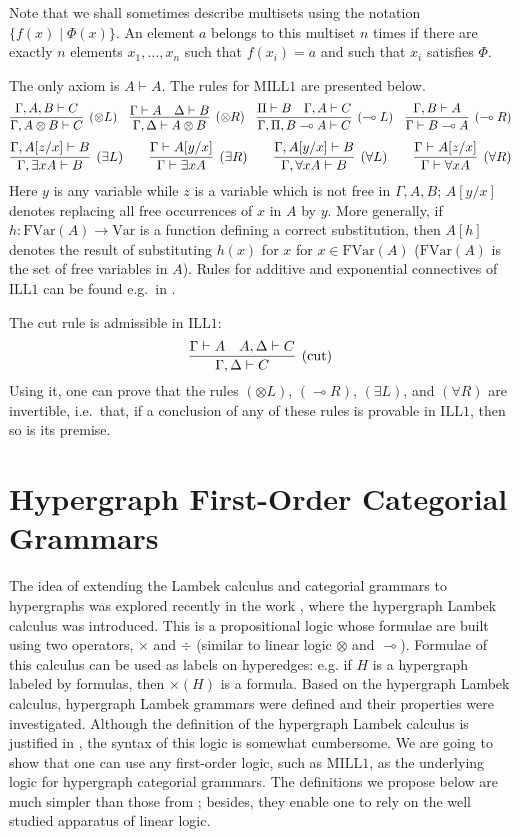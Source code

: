 \documentclass[a4paper,UKenglish,cleveref, autoref, thm-restate,pdfa]{lipics-v2021}
\newcommand{\Var}{\mathrm{Var}}
\newcommand{\FVar}{\mathrm{FVar}}
\newcommand{\mconj}{\otimes}
\newcommand{\limpl}{\multimap}
\newcommand{\yields}{\vdash}
\newcommand{\ILLFO}{\mathrm{ILL}1}
\newcommand{\MILLFO}{\mathrm{MILL}1}
\begin{document}
Note that we shall sometimes describe multisets using the notation $\{f(x) \mid \Phi(x) \}$. An element $a$ belongs to this multiset $n$ times if there are exactly $n$ elements $x_1,\ldots,x_n$ such that $f(x_i)=a$ and such that $x_i$ satisfies $\Phi$.

The only axiom is $A \vdash A$. The rules for $\MILLFO$ are presented below.
$$
\infer[(\mconj L)]{\Gamma,A \mconj B \yields C}{\Gamma,A, B \yields C}
\quad
\infer[(\mconj R)]{\Gamma,\Delta \yields A \mconj B}{\Gamma \yields A & \Delta \yields B}
\quad
\infer[(\multimap L)]{\Gamma, \Pi, B \multimap A \yields C}{\Pi \yields B & \Gamma, A \yields C}
\quad
\infer[(\multimap R)]{\Gamma \yields B \multimap A}{\Gamma, B \yields A}
$$
$$
\infer[(\exists L)]{\Gamma, \exists x A \yields B}{\Gamma, A[z/x] \yields B} 
\qquad
\infer[(\exists R)]{\Gamma \yields \exists x A}{\Gamma \yields A[y/x]}
\qquad
\infer[(\forall L)]{\Gamma, \forall x A \yields B}{\Gamma, A[y/x] \yields B} 
\qquad
\infer[(\forall R)]{\Gamma \yields \forall x A}{\Gamma \yields A[z/x]}
$$
Here $y$ is any variable while $z$ is a variable which is not free in $\Gamma,A,B$; $A[y/x]$ denotes replacing all free occurrences of $x$ in $A$ by $y$. More generally, if $h:\FVar(A) \to \Var$ is a function defining a correct substitution, then $A[h]$ denotes the result of substituting $h(x)$ for $x$ for $x \in \FVar(A)$ ($\FVar(A)$ is the set of free variables in $A$). Rules for additive and exponential connectives of $\ILLFO$ can be found e.g.~in \cite[Appendix E]{Shellinx91}.

The cut rule is admissible in $\ILLFO$:
$$
\infer[(\mathrm{cut})]{\Gamma,\Delta \yields C}{\Gamma \yields A & A, \Delta \yields C}
$$
Using it, one can prove that the rules $(\mconj L)$, $(\limpl R)$, $(\exists L)$, and $(\forall R)$ are invertible, i.e.~that, if a conclusion of any of these rules is provable in $\ILLFO$, then so is its premise.

\section{Hypergraph First-Order Categorial Grammars}\label{section:hypergraph-categorial-grammars}

The idea of extending the Lambek calculus and categorial grammars to hypergraphs was explored recently in the work \cite{Pshenitsyn22}, where the hypergraph Lambek calculus was introduced. This is a propositional logic whose formulae are built using two operators, $\times$ and $\div$ (similar to linear logic $\mconj$ and $\limpl$). Formulae of this calculus can be used as labels on hyperedges: e.g. if $H$ is a hypergraph labeled by formulas, then $\times(H)$ is a formula. Based on the hypergraph Lambek calculus, hypergraph Lambek grammars were defined and their properties were investigated. Although the definition of the hypergraph Lambek calculus is justified in \cite{Pshenitsyn22}, the syntax of this logic is somewhat cumbersome. We are going to show that one can use any first-order logic, such as $\MILLFO$, as the underlying logic for hypergraph categorial grammars. The definitions we propose below are much simpler than those from \cite{Pshenitsyn22}; besides, they enable one to rely on the well studied apparatus of linear logic.
\end{document}
